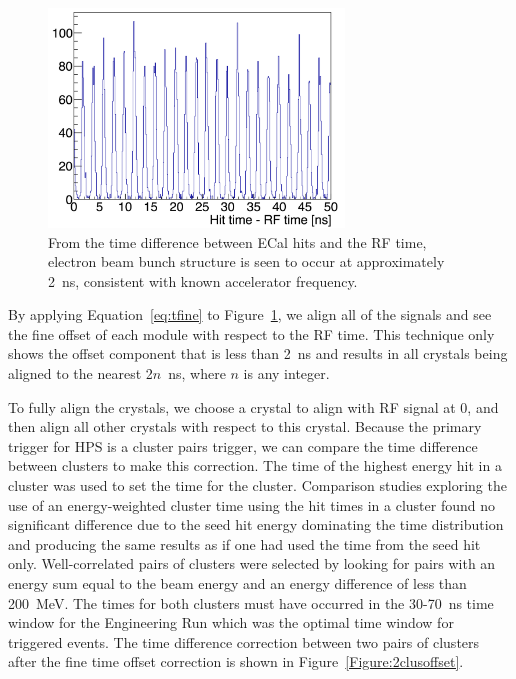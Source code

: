 \begin{figure}[H]
  \centering
      \includegraphics[width=0.7\textwidth]{pics/performance/beamStructure.png}
  \caption[Time difference between ECal hits and RF time]{From the time difference between ECal hits and the RF time, electron beam bunch structure is seen to occur at approximately 2~ns, consistent with known accelerator frequency.}
  \label{Figure:beamBunch}
\end{figure}

By applying Equation~\eqref{eq:tfine} to Figure~\ref{Figure:beamBunch}, we align all of the signals and see the fine offset of each module with respect to the RF time. This technique only shows the offset component that is less than 2~ns and results in all crystals being aligned to the nearest 2$n$~ns, where $n$ is any integer. 

To fully align the crystals, we choose a crystal to align with RF signal at 0, and then align all other crystals with respect to this crystal. Because the primary trigger for HPS is a cluster pairs trigger, we can compare the time difference between clusters to make this correction. The time of the highest energy hit in a cluster was used to set the time for the cluster. Comparison studies exploring the use of an energy-weighted cluster time using the hit times in a cluster found no significant difference due to the seed hit energy dominating the time distribution and producing the same results as if one had used the time from the seed hit only. Well-correlated pairs of clusters were selected by looking for pairs with an energy sum equal to the beam energy and an energy difference of less than 200~MeV. The times for both clusters must have occurred in the 30-70~ns time window for the Engineering Run which was the optimal time window for triggered events. The time difference correction between two pairs of clusters after the fine time offset correction is shown in Figure~\ref{Figure:2clusoffset}.

